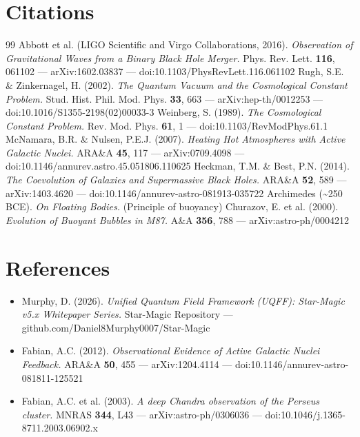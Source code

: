 \documentclass[12pt,a4paper]{article}
\begin{document}
\section*{Citations}
\begin{thebibliography}{99}
 Abbott et al. (LIGO Scientific and Virgo Collaborations, 2016). \emph{Observation of Gravitational Waves from a Binary Black Hole Merger.} Phys. Rev. Lett. \textbf{116}, 061102 --- arXiv:1602.03837 --- doi:10.1103/PhysRevLett.116.061102
 Rugh, S.E. \& Zinkernagel, H. (2002). \emph{The Quantum Vacuum and the Cosmological Constant Problem.} Stud. Hist. Phil. Mod. Phys. \textbf{33}, 663 --- arXiv:hep-th/0012253 --- doi:10.1016/S1355-2198(02)00033-3
 Weinberg, S. (1989). \emph{The Cosmological Constant Problem.} Rev. Mod. Phys. \textbf{61}, 1 --- doi:10.1103/RevModPhys.61.1
 McNamara, B.R. \& Nulsen, P.E.J. (2007). \emph{Heating Hot Atmospheres with Active Galactic Nuclei.} ARA\&A \textbf{45}, 117 --- arXiv:0709.4098 --- doi:10.1146/annurev.astro.45.051806.110625
 Heckman, T.M. \& Best, P.N. (2014). \emph{The Coevolution of Galaxies and Supermassive Black Holes.} ARA\&A \textbf{52}, 589 --- arXiv:1403.4620 --- doi:10.1146/annurev-astro-081913-035722
 Archimedes (\textasciitilde{}250 BCE). \emph{On Floating Bodies.} (Principle of buoyancy)
 Churazov, E. et al. (2000). \emph{Evolution of Buoyant Bubbles in M87.} A\&A \textbf{356}, 788 --- arXiv:astro-ph/0004212
\end{thebibliography}

\section*{References}
\begin{itemize}
  \item[2.] Murphy, D. (2026). \emph{Unified Quantum Field Framework (UQFF): Star-Magic v5.x Whitepaper Series.} Star-Magic Repository --- github.com/Daniel8Murphy0007/Star-Magic
  \item[5.] Fabian, A.C. (2012). \emph{Observational Evidence of Active Galactic Nuclei Feedback.} ARA\&A \textbf{50}, 455 --- arXiv:1204.4114 --- doi:10.1146/annurev-astro-081811-125521
  \item[10.] Fabian, A.C. et al. (2003). \emph{A deep Chandra observation of the Perseus cluster.} MNRAS \textbf{344}, L43 --- arXiv:astro-ph/0306036 --- doi:10.1046/j.1365-8711.2003.06902.x
\end{itemize}

\end{document}
